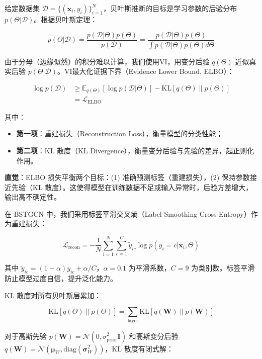 给定数据集 $\mathcal{D} = \{(\mathbf{x}_i, y_i)\}_{i=1}^N$，贝叶斯推断的目标是学习参数的后验分布 $p(\Theta | \mathcal{D})$。根据贝叶斯定理：

\begin{equation}
p(\Theta | \mathcal{D}) = \frac{p(\mathcal{D} | \Theta) p(\Theta)}{p(\mathcal{D})} = \frac{p(\mathcal{D} | \Theta) p(\Theta)}{\int p(\mathcal{D} | \Theta) p(\Theta) d\Theta}
\end{equation}

由于分母（边缘似然）的积分难以计算，我们使用VI，用变分后验 $q(\Theta)$ 近似真实后验 $p(\Theta | \mathcal{D})$。VI最大化证据下界（Evidence Lower Bound, ELBO）：

\begin{align}
\log p(\mathcal{D}) &\geq \mathbb{E}_{q(\Theta)}[\log p(\mathcal{D} | \Theta)] - \text{KL}[q(\Theta) \| p(\Theta)] \\
&= \mathcal{L}_{\text{ELBO}}
\end{align}

其中：
\begin{itemize}
  \item \textbf{第一项}：重建损失（Reconstruction Loss），衡量模型的分类性能；
  \item \textbf{第二项}：KL 散度（KL Divergence），衡量变分后验与先验的差异，起正则化作用。
\end{itemize}

\textbf{直觉}：ELBO 损失平衡两个目标：(1) 准确预测标签（重建损失），(2) 保持参数接近先验（KL 散度）。这使得模型在训练数据不足或输入异常时，后验方差增大，输出高不确定性。

在 BSTGCN 中，我们采用标签平滑交叉熵（Label Smoothing Cross-Entropy）作为重建损失：

\begin{equation}
\mathcal{L}_{\text{recon}} = -\frac{1}{N} \sum_{i=1}^N \sum_{c=1}^C \tilde{y}_{ic} \log p(y_i=c | \mathbf{x}_i, \Theta)
\end{equation}

其中 $\tilde{y}_{ic} = (1-\alpha) y_{ic} + \alpha / C$，$\alpha=0.1$ 为平滑系数，$C=9$ 为类别数。标签平滑防止模型过度自信，提升泛化能力。

KL 散度对所有贝叶斯层累加：

\begin{equation}
\text{KL}[q(\Theta) \| p(\Theta)] = \sum_{\text{layer}} \text{KL}[q(\mathbf{W}) \| p(\mathbf{W})]
\end{equation}

对于高斯先验 $p(\mathbf{W}) = \mathcal{N}(0, \sigma_{\text{prior}}^2 \mathbf{I})$ 和高斯变分后验 $q(\mathbf{W}) = \mathcal{N}(\boldsymbol{\mu}_W, \text{diag}(\boldsymbol{\sigma}_W^2))$，KL 散度有闭式解：

